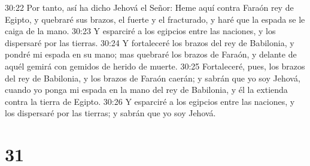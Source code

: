 30:22 Por tanto, así ha dicho Jehová el Señor: Heme aquí contra Faraón rey de Egipto, y quebraré sus brazos, el fuerte y el fracturado, y haré que la espada se le caiga de la mano.  
30:23 Y esparciré a los egipcios entre las naciones, y los dispersaré por las tierras.  
30:24 Y fortaleceré los brazos del rey de Babilonia, y pondré mi espada en su mano; mas quebraré los brazos de Faraón, y delante de aquél gemirá con gemidos de herido de muerte.  
30:25 Fortaleceré, pues, los brazos del rey de Babilonia, y los brazos de Faraón caerán; y sabrán que yo soy Jehová, cuando yo ponga mi espada en la mano del rey de Babilonia, y él la extienda contra la tierra de Egipto.  
30:26 Y esparciré a los egipcios entre las naciones, y los dispersaré por las tierras; y sabrán que yo soy Jehová.  

\chapter{31}


